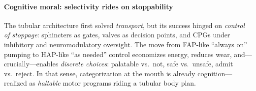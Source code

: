 \paragraph{Cognitive moral: selectivity rides on stoppability}
The tubular architecture first solved \emph{transport}, but its success hinged on \emph{control of stoppage}: sphincters as gates, valves as decision points, and CPGs under inhibitory and neuromodulatory oversight. The move from FAP-like “always on” pumping to HAP-like “as needed” control economizes energy, reduces wear, and—crucially—enables \emph{discrete choices}: palatable vs.\ not, safe vs.\ unsafe, admit vs.\ reject. In that sense, categorization at the mouth is already cognition—realized as \emph{haltable} motor programs riding a tubular body plan.
